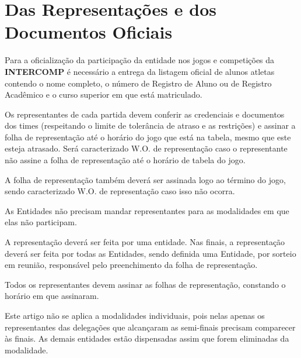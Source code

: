 
{\let\clearpage\relax \chapter{Das Representações e dos Documentos Oficiais}}

\begin{article}
	Para a oficialização da participação da entidade nos jogos e competições da \textbf{INTERCOMP} é necessário a entrega da listagem oficial de alunos atletas contendo o nome completo, o número de Registro de Aluno ou de Registro Acadêmico e o curso superior em que está matriculado.
\end{article}

\begin{article}
	Os representantes de cada partida devem conferir as credenciais e documentos dos times (respeitando o limite de tolerância de atraso e as restrições) e assinar a folha de representação até o horário do jogo que está na tabela, mesmo que este esteja atrasado. Será caracterizado W.O. de representação caso o representante não assine a folha de representação até o horário de tabela do jogo.

	\begin{xparagraph}
		A folha de representação também deverá ser assinada logo ao término do jogo, sendo caracterizado W.O. de representação caso isso não ocorra.
	\end{xparagraph}

	\begin{xparagraph}
		As Entidades não precisam mandar representantes para as modalidades em que elas não participam.
	\end{xparagraph}
\end{article}

\begin{article}
	A representação deverá ser feita por uma entidade. Nas finais, a representação deverá ser feita por todas as Entidades, sendo definida uma Entidade, por sorteio em reunião, responsável pelo preenchimento da folha de representação.

	\begin{xparagraph}
		Todos os representantes devem assinar as folhas de representação, constando o horário em que assinaram.
	\end{xparagraph}

	\begin{xparagraph}
		Este artigo não se aplica a modalidades individuais, pois nelas apenas os representantes das delegações que alcançaram as semi-finais precisam comparecer às finais. As demais entidades estão dispensadas assim que forem eliminadas da modalidade.
	\end{xparagraph}
\end{article}

